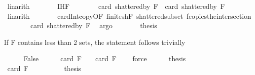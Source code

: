 \begin{isabellebody}
\ linarith\isanewline
\ \ \ \ \isamarkupfalse%
\ \isamarkupfalse%
\ IH{\isacharunderscore}{\kern0pt}F{}\isanewline
\ \ \ \ \isamarkupfalse%
\ {\isachardoublequoteopen}{\isachardot}{\kern0pt}{\isachardot}{\kern0pt}{\isachardot}{\kern0pt}\ {\isasymle}\ card\ {\isacharparenleft}{\kern0pt}shattered{\isacharunderscore}{\kern0pt}by\ {\isacharquery}{\kern0pt}F{}{\isacharparenright}{\kern0pt}\ {\isacharplus}{\kern0pt}\ card\ {\isacharparenleft}{\kern0pt}shattered{\isacharunderscore}{\kern0pt}by\ {\isacharquery}{\kern0pt}F{}{\isacharparenright}{\kern0pt}{\isachardoublequoteclose}\ \isamarkupfalse%
\ linarith\isanewline
\ \ \ \ \isamarkupfalse%
\ \isamarkupfalse%
\ card{\isacharunderscore}{\kern0pt}Int{\isacharunderscore}{\kern0pt}copy{\isacharbrackleft}{\kern0pt}OF\ finite{\isacharunderscore}{\kern0pt}shF\ shattered{\isacharunderscore}{\kern0pt}subset\ f{\isacharunderscore}{\kern0pt}copies{\isacharunderscore}{\kern0pt}the{\isacharunderscore}{\kern0pt}intersection{\isacharbrackright}{\kern0pt}\isanewline
\ \ \ \ \isamarkupfalse%
\ {\isachardoublequoteopen}{\isachardot}{\kern0pt}{\isachardot}{\kern0pt}{\isachardot}{\kern0pt}\ {\isasymle}\ card\ {\isacharparenleft}{\kern0pt}shattered{\isacharunderscore}{\kern0pt}by\ F{\isacharparenright}{\kern0pt}{\isachardoublequoteclose}\ \isamarkupfalse%
\ argo\isanewline
\ \ \ \ \isamarkupfalse%
\ \isamarkupfalse%
\ {\isacharquery}{\kern0pt}thesis\ \isacommand{{\isachardot}{\kern0pt}}\isamarkupfalse%
\isanewline
\ \ \isamarkupfalse%
%
\begin{isamarkuptext}%
If F contains less than 2 sets, the statement follows trivially%
\end{isamarkuptext}\isamarkuptrue%
\ \ \ \ \isamarkupfalse%
\ False\isanewline
\ \ \ \ \isamarkupfalse%
\ {\isachardoublequoteopen}card\ F\ {\isacharequal}{\kern0pt}\ {}\ {\isasymor}\ card\ F\ {\isacharequal}{\kern0pt}\ {}{\isachardoublequoteclose}\ \isamarkupfalse%
\ force\isanewline
\ \ \ \ \isamarkupfalse%
\ {\isacharquery}{\kern0pt}thesis\isanewline
\ \ \ \ \isamarkupfalse%
\isanewline
\ \ \ \ \ \ \isamarkupfalse%
\ {\isachardoublequoteopen}card\ F\ {\isacharequal}{\kern0pt}\ {}{\isachardoublequoteclose}\isanewline
\ \ \ \ \ \ \isamarkupfalse%
\ {\isacharquery}{\kern0pt}thesis\ \isamarkupfalse%

\end{isabellebody}

